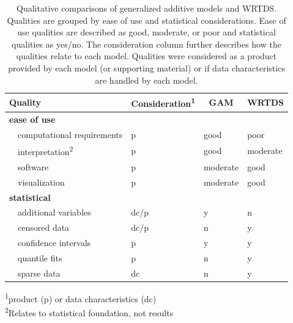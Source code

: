 \documentclass[letterpaper,12pt,oneside]{article}\usepackage[]{graphicx}\usepackage[]{color}
\begin{document}
\begin{table}[!tbp]
\caption{Qualitative comparisons of generalized additive models and WRTDS.  Qualities are grouped by ease of use and statistical considerations.  Ease of use qualities are described as good, moderate, or poor and statistical qualities as yes/no.  The consideration column further describes how the qualities relate to each model.  Qualities were considered as a product provided by each model (or supporting material) or if data characteristics are handled by each model.\label{tab:qualcomp}} 
\begin{center}
\begin{tabular}{llll}
\hline\hline
\multicolumn{1}{l}{Quality}&\multicolumn{1}{c}{Consideration\textsuperscript{1}}&\multicolumn{1}{c}{\ac{GAM}}&\multicolumn{1}{c}{\ac{WRTDS}}\tabularnewline
\hline
{\bfseries ease of use}&&&\tabularnewline
~~computational requirements&p&good&poor\tabularnewline
~~interpretation\textsuperscript{2}&p&good&moderate\tabularnewline
~~software&p&moderate&good\tabularnewline
~~visualization&p&moderate&good\tabularnewline
\hline
{\bfseries statistical}&&&\tabularnewline
~~additional variables&dc/p&y&n\tabularnewline
~~censored data&dc/p&n&y\tabularnewline
~~confidence intervals&p&y&y\tabularnewline
~~quantile fits&p&n&y\tabularnewline
~~sparse data&dc&n&y\tabularnewline
\hline
\end{tabular}\end{center}

\textsuperscript{1}\footnotesize{product (p) or data characteristics (dc)}\\\textsuperscript{2}\footnotesize{Relates to statistical foundation, not results}\end{table}



\end{document}
